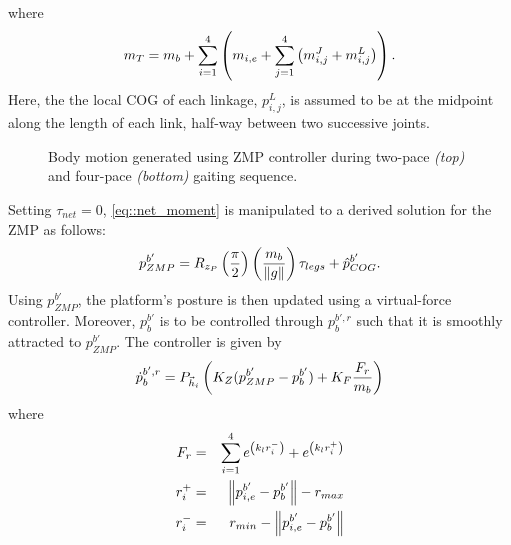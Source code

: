 		where
			\begin{equation}
				m_{T} = m_{b} + \sum_{i=1}^{4} \left(m_{i,e} + \sum_{j=1}^{4} \left(  m_{i,j}^{J} +  m_{i,j}^{L} \right) \right).
			\end{equation}
		Here, the the local COG of each linkage, ${p}_{i,j}^{L}$, is assumed to be at the midpoint along the length of each link, half-way between two successive joints.
			\begin{figure}[!h]
				\centering
				\caption{Body motion generated using ZMP controller during two-pace \emph{(top)} and four-pace \emph{(bottom)} gaiting sequence.}
				\label{fig::body_motion}
			\end{figure}
		Setting $\tau_{net}=0$, \ref{eq::net_moment} is manipulated to a derived solution for the ZMP as follows:
			\begin{equation}
				{p}_{ZMP}^{b'} = R_{z_P} \left(\frac{\pi}{2}\right)  \left( \frac{m_{b}}{\left\lVert g\right\rVert}\right) \tau_{legs} + \hat{p}_{COG}^{b'}.
				\label{eq::ZMPFromMoment}
			\end{equation}
		Using ${p}_{ZMP}^{b'}$, the platform's posture is then updated using a virtual-force controller. Moreover, ${p}_{b}^{b'}$ is to be controlled through  ${p}_{b}^{b',r}$ such that it is smoothly attracted to ${p}_{ZMP}^{b'}$. The controller is given by
			\begin{equation}
				\dot{p}_{b}^{b',r} 	= {P}_{\vec{h}_{i}} \left(K_{Z}	( {p}_{ZMP}^{b'} - {p}_{b}^{b'} )  
				+ K_{F}\frac{F_{r}}{m_{b}}  \right)
				\label{eq::ZMPController}
			\end{equation}	
		where
			\begin{eqnarray*}
				F_{r} 	& = &  \sum_{i=1}^{4}  e^{\left( k_{l} r_{i}^{-} \right) } + e^{ \left( k_{l} r_{i}^{+} \right) } \nonumber \\
				r_{i}^{+}	& = & \left\lVert{p}_{i,e}^{b'}- {p}_{b}^{b'}\right\rVert - r_{max} \nonumber \\
				r_{i}^{-}	& = & r_{min} - \left\lVert{p}_{i,e}^{b'}- {p}_{b}^{b'}\right\rVert \nonumber
			\end{eqnarray*}

